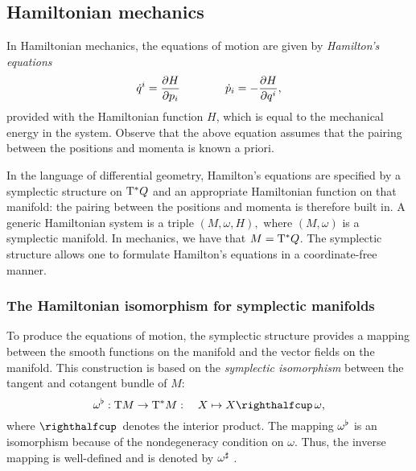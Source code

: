\subsection{Hamiltonian mechanics}
\label{ssec:symplectic_ham_systems}
In Hamiltonian mechanics, the equations of motion are given by \emph{Hamilton's equations}
\begin{equation}
     \dot{q}^i = \pdv{H}{p_i} \qquad\qquad \dot{p}_i = -\pdv{H}{q^i},
     \label{eq:hamilton_equations}
\end{equation}
provided with the Hamiltonian function \(H\), which is equal to the mechanical energy in the system. Observe that the above equation assumes that the pairing between the positions and momenta is known a priori. 

In the language of differential geometry, Hamilton's equations are specified by a symplectic structure on \(\mathrm{T}^*Q\) and an appropriate Hamiltonian function on that manifold: the pairing between the positions and momenta is therefore built in. A generic Hamiltonian system is a triple \( (M, \omega, H), \) where \( (M, \omega) \) is a symplectic manifold. In mechanics, we have that \( M = \mathrm{T}^*Q \). The symplectic structure allows one to formulate Hamilton's equations in a coordinate-free manner.

\subsubsection{The Hamiltonian isomorphism for symplectic manifolds}
To produce the equations of motion, the symplectic structure provides a mapping between the smooth functions on the manifold and the vector fields on the manifold. 
This construction is based on the \emph{symplectic isomorphism} between the tangent and cotangent bundle of $M$:
\begin{equation}
    \toDual{\omega}: \tbundle{M} \to \ctbundle{M}:\quad X \mapsto \intpr{X}{\omega}, 
    \label{eq:symplectic_isomorphism}
\end{equation}
where $\intpr{}{}$ denotes the interior product. The mapping $\omega^\flat$ is an isomorphism because of the nondegeneracy condition on $\omega$. Thus, the inverse mapping is well-defined and is denoted by \(\omega^\sharp\) \cite{Libermann1987}.

